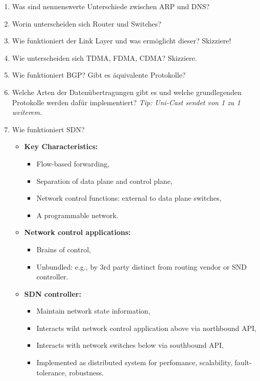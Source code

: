 \documentclass{scrartcl}
\begin{document}
\begin{enumerate}
        \item Was sind nennenswerte Unterschiede zwischen ARP und DNS?
        \item Worin unterscheiden sich Router und Switches?
        \item Wie funktioniert der Link Layer und was ermöglicht dieser? Skizziere!
        \item Wie unterscheiden sich TDMA, FDMA, CDMA? Skizziere.
        \item Wie funktioniert BGP? Gibt es äquivalente Protokolle?
        \item Welche Arten der Datenübertragungen gibt es und welche grundlegenden Protokolle werden dafür implementiert? 
        \textit{Tip: Uni-Cast sendet von 1 zu 1 weiterem.}
        \item Wie funktioniert SDN?
        \begin{itemize}
            \item \textbf{Key Characteristics:}
            \begin{itemize}
                \item Flow-based forwarding,
                \item Separation of data plane and control plane,
                \item Network control functions: external to data plane switches,
                \item A programmable network.
            \end{itemize}
            
            \item \textbf{Network control applications:}
            \begin{itemize}
                \item Brains of control,
                \item Unbundled: e.g., by 3rd party distinct from routing vendor or SND controller.
            \end{itemize}

            \item \textbf{SDN controller:}
            \begin{itemize}
                \item Maintain network state information,
                \item Interacts wiht network control application above via northbound API,
                \item Interacts with network switches below via southbound API,
                \item Implemented as distributed system for perfomance, scalability, fault-tolerance, robustness.
            \end{itemize}


\end{itemize}
\end{enumerate}
\end{document}
